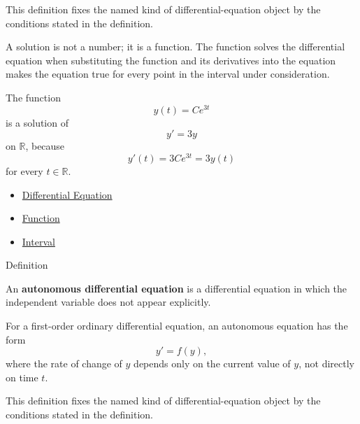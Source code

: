 \begin{remark*}
This definition fixes the named kind of differential-equation object by the
conditions stated in the definition.
\end{remark*}

\begin{remark*}[Interpretation]
A solution is not a number; it is a function. The function solves the differential equation when substituting the function and its derivatives into the equation makes the equation true for every point in the interval under consideration.
\end{remark*}

\begin{remark*}[Examples]
The function
\[
y(t)=Ce^{3t}
\]
is a solution of
\[
y'=3y
\]
on $\mathbb{R}$, because
\[
y'(t)=3Ce^{3t}=3y(t)
\]
for every $t\in\mathbb{R}$.
\end{remark*}

\begin{dependencies}
\begin{itemize}
  \item \hyperref[def:ordinary-differential-equations-terminology-differential-equation]{Differential Equation}
  \item \hyperref[def:function]{Function}
  \item \hyperref[def:interval]{Interval}
\end{itemize}
\end{dependencies}


\begin{definitionbox}{Definition}
\begin{definition}
\label{def:ordinary-differential-equations-terminology-autonomous-differential-equation}
An \textbf{autonomous differential equation} is a differential equation in which the independent variable does not appear explicitly.

For a first-order ordinary differential equation, an autonomous equation has the form
\[
y'=f(y),
\]
where the rate of change of $y$ depends only on the current value of $y$, not directly on time $t$.
\end{definition}
\end{definitionbox}

\begin{remark*}
This definition fixes the named kind of differential-equation object by the
conditions stated in the definition.
\end{remark*}

